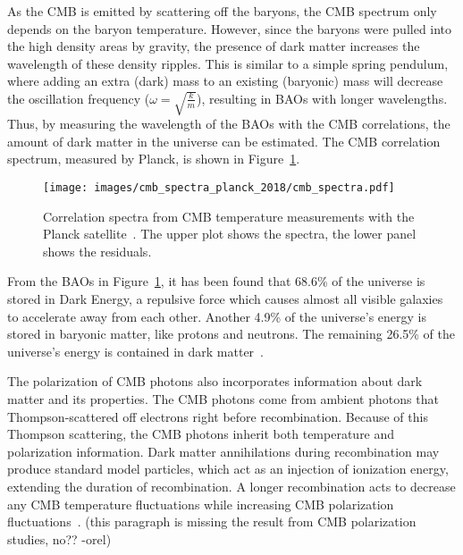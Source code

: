 As the CMB is emitted by scattering off the baryons, the CMB spectrum only depends on the baryon temperature.
However, since the baryons were pulled into the high density areas by gravity, the presence of dark matter increases the wavelength of these density ripples.
This is similar to a simple spring pendulum, where adding an extra (dark) mass to an existing (baryonic) mass will decrease the oscillation frequency ($\omega = \sqrt{\frac{k}{m}}$), resulting in BAOs with longer wavelengths.
Thus, by measuring the wavelength of the BAOs with the CMB correlations, the amount of dark matter in the universe can be estimated.
The CMB correlation spectrum, measured by Planck, is shown in Figure~\ref{fig:cmb_correlation_spectra}.

\begin{figure}[t]
  \centering
  \texttt{[image: images/cmb\_spectra\_planck\_2018/cmb\_spectra.pdf]}
  \caption[Cosmic Micrwave Background Correlation Spectrum]{
    Correlation spectra from CMB temperature measurements with the Planck satellite~\cite{planck_dm_limit}.
    The upper plot shows the spectra, the lower panel shows the residuals.
  }
  \label{fig:cmb_correlation_spectra}
\end{figure}

From the BAOs in Figure~\ref{fig:cmb_correlation_spectra}, it has been found that 68.6\% of the universe is stored in Dark Energy, a repulsive force which causes almost all visible galaxies to accelerate away from each other.
Another 4.9\% of the universe's energy is stored in baryonic matter, like protons and neutrons.
The remaining 26.5\% of the universe's energy is contained in dark matter~\cite{planck2015}.

The polarization of CMB photons also incorporates information about dark matter and its properties.
The CMB photons come from ambient photons that Thompson-scattered off electrons right before recombination.
Because of this Thompson scattering, the CMB photons inherit both temperature and polarization information.
Dark matter annihilations during recombination may produce standard model particles, which act as an injection of ionization energy, extending the duration of recombination.
A longer recombination acts to decrease any CMB temperature fluctuations while increasing CMB polarization fluctuations~\cite{cmb_polarization1,cmb_polarization2}.
{\color{red}(this paragraph is missing the result from CMB polarization studies, no?? -orel)}

